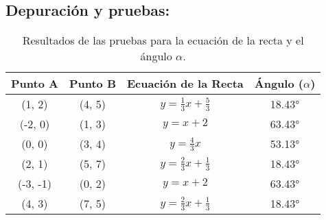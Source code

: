 \subsection{\textbf{Depuración y pruebas:}}
\begin{table}[h]
    \centering
    \begin{tabular}{|c|c|c|c|}
        \hline
        \textbf{Punto A} & \textbf{Punto B} & \textbf{Ecuación de la Recta} & \textbf{Ángulo (\(\alpha\))} \\
        \hline
        (1, 2) & (4, 5) & \(y = \frac{1}{3}x + \frac{5}{3}\) & 18.43° \\
        \hline
        (-2, 0) & (1, 3) & \(y = x + 2\) & 63.43° \\
        \hline
        (0, 0) & (3, 4) & \(y = \frac{4}{3}x\) & 53.13° \\
        \hline
        (2, 1) & (5, 7) & \(y = \frac{2}{3}x + \frac{1}{3}\) & 18.43° \\
        \hline
        (-3, -1) & (0, 2) & \(y = x + 2\) & 63.43° \\
        \hline
        (4, 3) & (7, 5) & \(y = \frac{2}{3}x + \frac{1}{3}\) & 18.43° \\
        \hline
    \end{tabular}
    \caption{Resultados de las pruebas para la ecuación de la recta y el ángulo \(\alpha\).}
    \label{tab:pruebas}
\end{table}